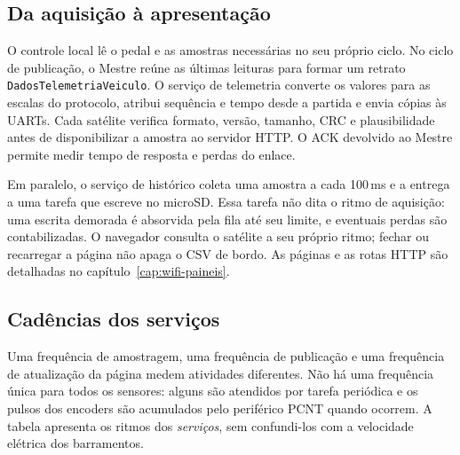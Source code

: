 \subsection{Da aquisição à apresentação}
O controle local lê o pedal e as amostras necessárias no seu próprio ciclo. No ciclo de publicação, o Mestre reúne as últimas leituras para formar um retrato \texttt{DadosTelemetriaVeiculo}. O serviço de telemetria converte os valores para as escalas do protocolo, atribui sequência e tempo desde a partida e envia cópias às UARTs. Cada satélite verifica formato, versão, tamanho, CRC e plausibilidade antes de disponibilizar a amostra ao servidor HTTP. O ACK devolvido ao Mestre permite medir tempo de resposta e perdas do enlace.

Em paralelo, o serviço de histórico coleta uma amostra a cada 100\,ms e a entrega a uma tarefa que escreve no microSD. Essa tarefa não dita o ritmo de aquisição: uma escrita demorada é absorvida pela fila até seu limite, e eventuais perdas são contabilizadas. O navegador consulta o satélite a seu próprio ritmo; fechar ou recarregar a página não apaga o CSV de bordo. As páginas e as rotas HTTP são detalhadas no capítulo~\ref{cap:wifi-paineis}.

\subsection{Cadências dos serviços}
Uma frequência de amostragem, uma frequência de publicação e uma frequência de atualização da página medem atividades diferentes. Não há uma frequência única para todos os sensores: alguns são atendidos por tarefa periódica e os pulsos dos encoders são acumulados pelo periférico PCNT quando ocorrem. A tabela apresenta os ritmos dos \emph{serviços}, sem confundi-los com a velocidade elétrica dos barramentos.

